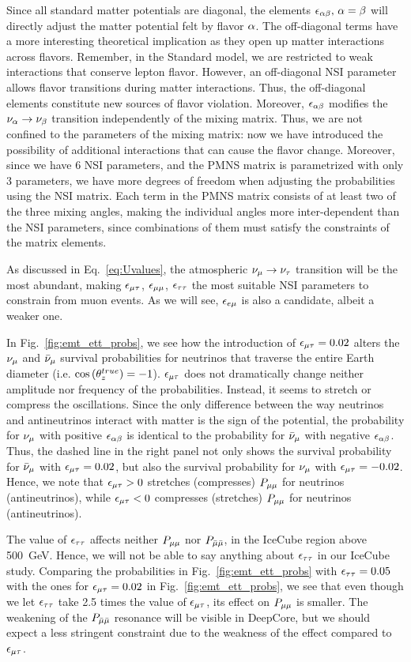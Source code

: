 Since all standard matter potentials are diagonal, 
the elements $\epsilon_{\alpha\beta},\, \alpha = \beta$ will directly adjust the matter potential felt 
by flavor $\alpha$. The off-diagonal terms have a more interesting theoretical implication as they open up matter interactions across flavors. Remember, in the Standard model,
we are restricted to weak interactions that conserve lepton flavor. However, an off-diagonal NSI parameter allows flavor transitions during matter interactions. Thus,
the off-diagonal elements constitute new sources of flavor violation.
Moreover, $\epsilon_{\alpha\beta}$ modifies the $\nu_\alpha \to \nu_\beta$ transition independently
of the mixing matrix. Thus, we are not confined to the parameters of the mixing matrix: now we have introduced the 
possibility of additional interactions that can cause the flavor change. Moreover, since we have 6 NSI parameters, and the PMNS
matrix is parametrized with only 3 parameters, we have more degrees of freedom when adjusting the probabilities using the NSI matrix. Each term in the PMNS matrix consists of at least
two of the three mixing angles, making the individual angles more inter-dependent than the NSI parameters, since combinations of them must satisfy the constraints of the matrix elements.

As discussed in Eq.~\ref{eq:Uvalues}, the atmospheric $\nu_\mu \to \nu_\tau$ transition will be the most abundant, making $\epsilon_{\mu\tau}$, $\epsilon_{\mu\mu}$, $\epsilon_{\tau\tau}$ the most suitable
NSI parameters to constrain from muon events. As we will see, $\epsilon_{e\mu}$ is also a candidate, albeit a weaker one. 

In Fig.~\ref{fig:emt_ett_probs}, we see how the introduction of $\epsilon_{\mu\tau} = 0.02$ alters the $\nu_\mu$ and $\bar{\nu}_\mu$ survival probabilities
for neutrinos that traverse the entire Earth diameter (i.e. $\cos{(\theta_z^{true})} = -1$). $\epsilon_{\mu\tau}$ does not dramatically change neither
amplitude nor frequency of the probabilities. Instead, it seems to stretch or compress the oscillations. Since the 
only difference between the way neutrinos and antineutrinos interact with matter is the sign of the potential, the probability for
$\nu_\mu$ with positive $\epsilon_{\alpha\beta}$ is identical to the probability for $\bar{\nu}_\mu$ with negative $\epsilon_{\alpha\beta}$. Thus, the dashed line 
in the right panel not only shows the survival probability for $\bar{\nu}_\mu$ with $\epsilon_{\mu\tau}=0.02$, but also the survival probability for $\nu_\mu$ with $\epsilon_{\mu\tau}=-0.02$.
Hence, we note that $\epsilon_{\mu\tau} > 0$ stretches (compresses) $P_{\mu\mu}$ for neutrinos (antineutrinos), while $\epsilon_{\mu\tau} < 0$ compresses (stretches) $P_{\mu\mu}$ for neutrinos (antineutrinos).

The value of $\epsilon_{\tau\tau}$ affects neither $P_{\mu\mu}$ nor $P_{\bar{\mu} \bar{\mu}}$, in the IceCube region above \SI{500}{\GeV}. Hence, we will not be able
to say anything about $\epsilon_{\tau\tau}$ in our IceCube study.  Comparing the probabilities in Fig.~\ref{fig:emt_ett_probs} with $\epsilon_{\tau\tau} = 0.05$ with the ones for $\epsilon_{\mu\tau} = 0.02$ in Fig.~\ref{fig:emt_ett_probs},
we see that even though we let $\epsilon_{\tau\tau}$ take 2.5 times the value of $\epsilon_{\mu\tau}$, its effect on $P_{\mu\mu}$ is smaller. The weakening of the $P_{\bar{\mu} \bar{\mu}}$ resonance will be visible in DeepCore, but we should expect a less stringent 
constraint due to the weakness of the effect compared to $\epsilon_{\mu\tau}$. 


